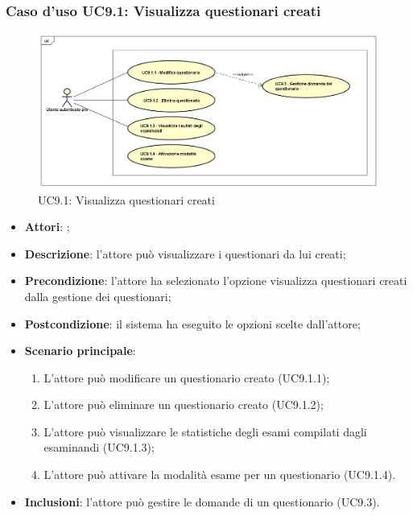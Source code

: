 		\subsubsection{Caso d'uso UC9.1: Visualizza questionari creati}
		\label{UC9.1}
		\begin{figure}[h]
			\centering
		\includegraphics[scale=0.5,keepaspectratio]{UML/UC9_1.png}
			\caption{UC9.1: Visualizza questionari creati}
		\end{figure}
		\FloatBarrier
		\begin{itemize}
			\item \textbf{Attori}: \uaupro{};
			\item \textbf{Descrizione}: l'attore può visualizzare i questionari da lui creati;
			\item \textbf{Precondizione}: l'attore ha selezionato l'opzione visualizza questionari creati dalla gestione dei questionari;
			\item \textbf{Postcondizione}: il sistema ha eseguito le opzioni scelte dall'attore;
			\item \textbf{Scenario principale}: 
				\begin{enumerate}
					\item L'attore può modificare un questionario creato (UC9.1.1);
					\item L'attore può eliminare un questionario creato (UC9.1.2);
					\item L'attore può visualizzare le statistiche degli esami compilati dagli esaminandi (UC9.1.3);
					\item L'attore può attivare la modalità esame per un questionario (UC9.1.4).
				\end{enumerate}
				\item \textbf{Inclusioni}: l'attore può gestire le domande di un questionario (UC9.3).
		\end{itemize}
		
